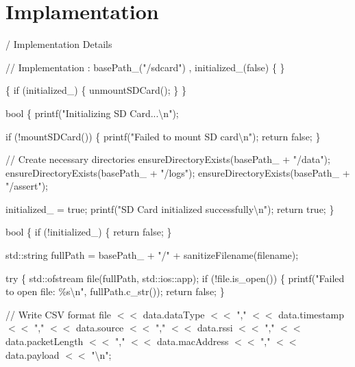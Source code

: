 \chapter{Implamentation }
\hypertarget{md__implamentation}{}\label{md__implamentation}
/ Implementation Details

//  Implementation  \+: base\+Path\+\_\+("{}/sdcard"{}) , initialized\+\_\+(false) \{ \}

 \{ if (initialized\+\_\+) \{ unmount\+SDCard(); \} \}

bool  \{ printf("{}\+Initializing SD Card...\textbackslash{}n"{});

if (!mount\+SDCard()) \{ printf("{}\+Failed to mount SD card\textbackslash{}n"{}); return false; \}

// Create necessary directories ensure\+Directory\+Exists(base\+Path\+\_\+ + "{}/data"{}); ensure\+Directory\+Exists(base\+Path\+\_\+ + "{}/logs"{}); ensure\+Directory\+Exists(base\+Path\+\_\+ + "{}/assert"{});

initialized\+\_\+ = true; printf("{}\+SD Card initialized successfully\textbackslash{}n"{}); return true; \}

bool  \{ if (!initialized\+\_\+) \{ return false; \}

std\+::string full\+Path = base\+Path\+\_\+ + "{}/"{} + sanitize\+Filename(filename);

try \{ std\+::ofstream file(full\+Path, std\+::ios\+::app); if (!file.is\+\_\+open()) \{ printf("{}\+Failed to open file\+: \%s\textbackslash{}n"{}, full\+Path.\+c\+\_\+str()); return false; \}

// Write CSV format file \texorpdfstring{$<$}{<}\texorpdfstring{$<$}{<} data.\+data\+Type \texorpdfstring{$<$}{<}\texorpdfstring{$<$}{<} "{},"{} \texorpdfstring{$<$}{<}\texorpdfstring{$<$}{<} data.\+timestamp \texorpdfstring{$<$}{<}\texorpdfstring{$<$}{<} "{},"{} \texorpdfstring{$<$}{<}\texorpdfstring{$<$}{<} data.\+source \texorpdfstring{$<$}{<}\texorpdfstring{$<$}{<} "{},"{} \texorpdfstring{$<$}{<}\texorpdfstring{$<$}{<} data.\+rssi \texorpdfstring{$<$}{<}\texorpdfstring{$<$}{<} "{},"{} \texorpdfstring{$<$}{<}\texorpdfstring{$<$}{<} data.\+packet\+Length \texorpdfstring{$<$}{<}\texorpdfstring{$<$}{<} "{},"{} \texorpdfstring{$<$}{<}\texorpdfstring{$<$}{<} data.\+mac\+Address \texorpdfstring{$<$}{<}\texorpdfstring{$<$}{<} "{},"{} \texorpdfstring{$<$}{<}\texorpdfstring{$<$}{<} data.\+payload \texorpdfstring{$<$}{<}\texorpdfstring{$<$}{<} "{}\textbackslash{}n"{};

